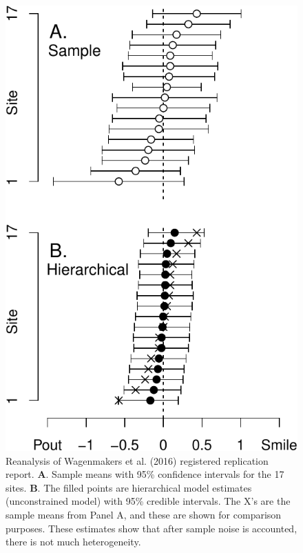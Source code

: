 \documentclass[english,man]{apa6}
\theoremstyle{definition}
\theoremstyle{definition}
\theoremstyle{remark}
\begin{document}
\begin{figure}[htbp]
\centering
\includegraphics{p_files/figure-latex/wagEst-1.pdf}
\caption{\label{fig:wagEst}Reanalysis of Wagenmakers et al. (2016)
registered replication report. \textbf{A}. Sample means with 95\%
confidence intervals for the 17 sites. \textbf{B}. The filled points are
hierarchical model estimates (unconstrained model) with 95\% credible
intervals. The X's are the sample means from Panel A, and these are
shown for comparison purposes. These estimates show that after sample
noise is accounted, there is not much heterogeneity.}
\end{figure}
\end{document}
